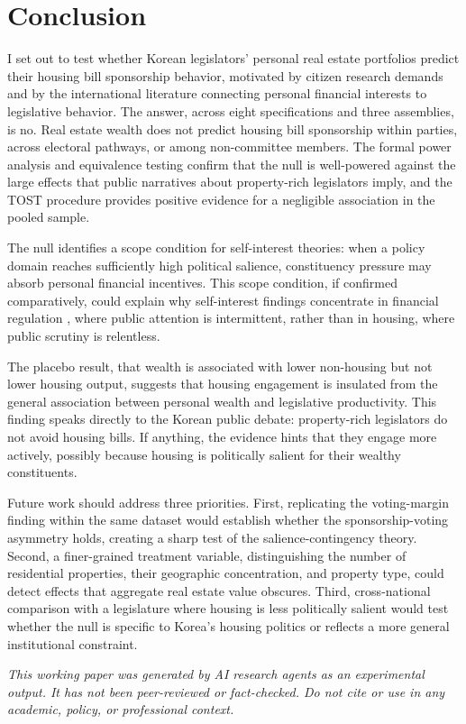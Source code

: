 \documentclass[11pt]{article}
\begin{document}
\section{Conclusion}
\label{sec:conclusion}

I set out to test whether Korean legislators' personal real estate portfolios predict their housing bill sponsorship behavior, motivated by citizen research demands and by the international literature connecting personal financial interests to legislative behavior. The answer, across eight specifications and three assemblies, is no. Real estate wealth does not predict housing bill sponsorship within parties, across electoral pathways, or among non-committee members. The formal power analysis and equivalence testing confirm that the null is well-powered against the large effects that public narratives about property-rich legislators imply, and the TOST procedure provides positive evidence for a negligible association in the pooled sample.

The null identifies a scope condition for self-interest theories: when a policy domain reaches sufficiently high political salience, constituency pressure may absorb personal financial incentives. This scope condition, if confirmed comparatively, could explain why self-interest findings concentrate in financial regulation \citep{tahoun2018}, where public attention is intermittent, rather than in housing, where public scrutiny is relentless.

The placebo result, that wealth is associated with lower non-housing but not lower housing output, suggests that housing engagement is insulated from the general association between personal wealth and legislative productivity. This finding speaks directly to the Korean public debate: property-rich legislators do not avoid housing bills. If anything, the evidence hints that they engage more actively, possibly because housing is politically salient for their wealthy constituents.

Future work should address three priorities. First, replicating the \citet{seo2025} voting-margin finding within the same dataset would establish whether the sponsorship-voting asymmetry holds, creating a sharp test of the salience-contingency theory. Second, a finer-grained treatment variable, distinguishing the number of residential properties, their geographic concentration, and property type, could detect effects that aggregate real estate value obscures. Third, cross-national comparison with a legislature where housing is less politically salient would test whether the null is specific to Korea's housing politics or reflects a more general institutional constraint.

\bigskip
\noindent\textit{This working paper was generated by AI research agents as an
experimental output. It has not been peer-reviewed or fact-checked.
Do not cite or use in any academic, policy, or professional context.}



\end{document}
